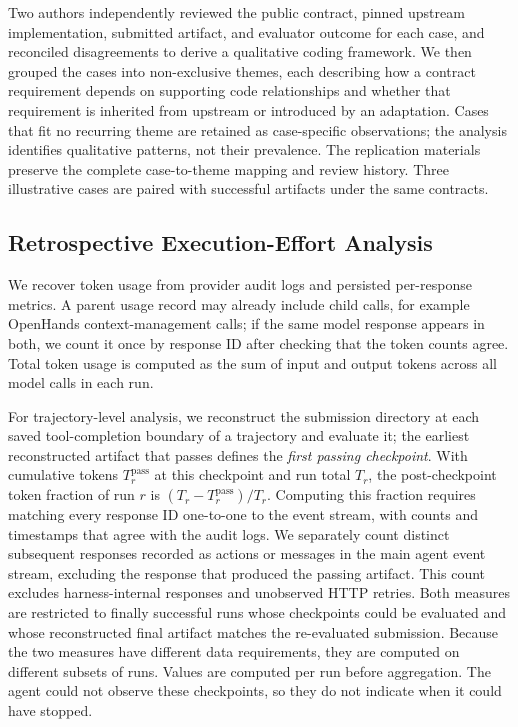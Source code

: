 \documentclass[acmsmall,screen,review,anonymous]{acmart}
\begin{document}
Two authors independently reviewed the public contract, pinned upstream
implementation, submitted artifact, and evaluator outcome for each case, and
reconciled disagreements to derive a qualitative coding framework. We then
grouped the cases into non-exclusive themes, each describing how a contract
requirement depends on supporting code relationships and whether that
requirement is inherited from upstream or introduced by an adaptation. Cases
that fit no recurring theme are retained as case-specific observations; the
analysis identifies qualitative patterns, not their prevalence. The replication materials preserve the complete case-to-theme
mapping and review history. Three illustrative cases are paired with successful
artifacts under the same contracts.

\subsection{Retrospective Execution-Effort Analysis}
\label{sec:execution-effort-protocol}

We recover token usage from provider audit logs and persisted per-response
metrics. A parent usage record may already include child calls, for example
OpenHands context-management calls; if the same model response appears in both,
we count it once by response ID after checking that the token counts agree.
Total token usage is computed as the sum of input and output tokens across all
model calls in each run.

For trajectory-level analysis, we reconstruct the submission directory at each
saved tool-completion boundary of a trajectory and evaluate it; the earliest
reconstructed artifact that passes defines the \emph{first passing checkpoint}.
With cumulative tokens $T_r^{\mathrm{pass}}$ at this checkpoint and run total
$T_r$, the post-checkpoint token fraction of run $r$ is
$(T_r-T_r^{\mathrm{pass}})/T_r$. Computing this fraction requires matching every
response ID one-to-one to the event stream, with counts and timestamps that
agree with the audit logs.
We separately count distinct subsequent responses recorded as actions or
messages in the main agent event stream, excluding the response that produced
the passing artifact. This count
excludes harness-internal responses and unobserved HTTP retries. Both measures are
restricted to finally successful runs whose checkpoints could be evaluated and
whose reconstructed final artifact matches the re-evaluated submission. Because
the two measures have different data requirements, they are computed on
different subsets of runs. Values are computed per run before aggregation. The
agent could not observe these checkpoints, so they do not indicate when it could
have stopped.
\end{document}

